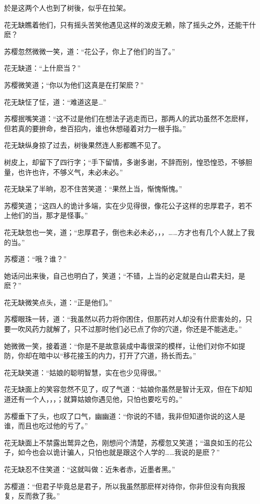 \documentclass[12pt,oneside]{book}
\begin{document}
於是这两个人也到了树後，似乎在拉架。

花无缺瞧着他们，只有摇头苦笑他遇见这样的泼皮无赖，除了摇头之外，还能干什麽？

苏樱忽然微微一笑，道：``花公子，你上了他们的当了。''

花无缺道：``上什麽当？''

苏樱微笑道；``你以为他们这真是在打架麽？''

花无缺怔了怔，道：``难道这是\ldots{}''

苏樱抿嘴笑道：``这不过是他们在想法子逃走而已，那两人的武功虽然不怎麽样，但若真的要拚命，叁百招内，谁也休想碰着对力一根手指。''

花无缺纵身掠了过去，树後果然连人影都瞧不见了。

树皮上，却留下了四行字；``手下留情，多谢多谢，不辞而别，惶恐惶恐，不够胆量，也许也许，不够义气，未必未必。''

花无缺呆了半晌，忍不住苦笑道：``果然上当，惭愧惭愧。''

苏樱笑道；``这四人的诡计多端，实在少见得很，像花公子这样的忠厚君子，若不上他们的当，那才是怪事。''

花无缺忽也一笑，道；``忠厚君子，倒也未必未必，，，\ldots\ldots 方才也有几个人就上了我的当。''

苏樱道：``哦？谁？''

她话问出来後，自己也明白了，笑道；``不错，上当的必定就是白山君夫妇，是麽？''

花无缺微笑点头，道：``正是他们。''

苏樱眼珠一转，道：``我虽然以药力将你困住，但那药对人却没有什麽害处的，只要一吹风药力就解了，只不过那时他们必已点了你的穴道，你还是不能逃走。''

她微微一笑，接着道：``你是不是故意装成中毒很深的模样，让他们对你不如提防，你却在暗中以``移花接玉的内力，打开了穴道，扬长而去。''

花无缺笑道：``姑娘的聪明智慧，实在也少见得很。''

花无缺面上的笑容忽然不见了，叹了气道：``姑娘你虽然是智计无双，但在下却知道还有一个人，，，；就算姑娘你遇见他，只怕也要吃亏的。''

苏樱垂下了头，也叹了口气，幽幽道：``你说的不错，我非但知道你说的这人是谁，而且也吃过他的亏了。''

花无缺面上不禁露出鹫异之色，刚想问个清楚，苏樱忽又笑道；``温良如玉的花公子，如今也会以诡计骗人，只怕也就是跟这个人学的\ldots\ldots 我说的是麽？''

花无缺忍不住笑道：``这就叫做：近朱者赤，近墨者黑。''

苏樱道：``但君子毕竟总是君子，所以我虽然那麽样对待你，你非但没有向我报复，反而救了我。''
\end{document}
